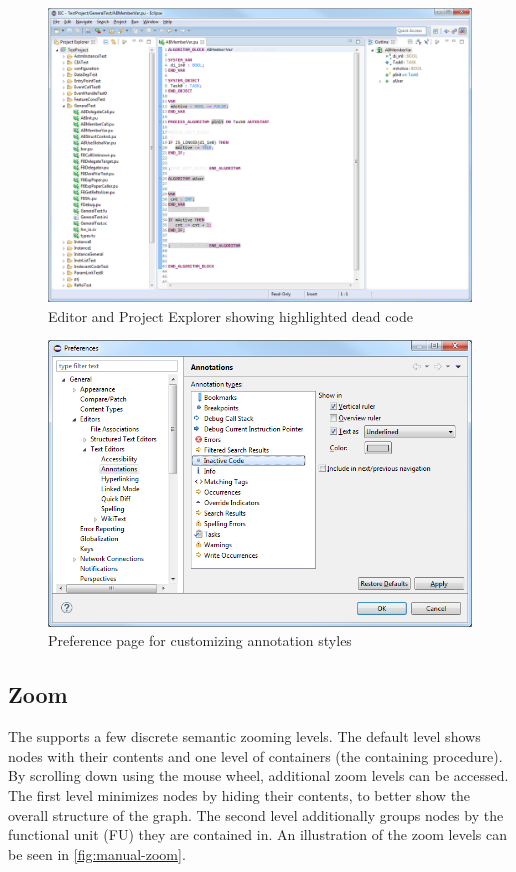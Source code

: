 \begin{figure}[htp]
  \centering
    \includegraphics[width=\textwidth]{bilder/manual-pruned}
  \caption{Editor and Project Explorer showing highlighted dead code}
  \label{fig:manual-pruned}
\end{figure}

\begin{figure}[htp]
  \centering
    \includegraphics[width=\textwidth]{bilder/manual-prefs_annotations}
  \caption{Preference page for customizing annotation styles}
  \label{fig:manual-prefs_annotations}
\end{figure}

\subsection{Zoom}

The \SB supports a few discrete semantic zooming levels. The default level shows nodes with their contents and one 
level of containers (the containing procedure). By scrolling down using the mouse wheel, additional zoom levels can be 
accessed. The first level minimizes nodes by hiding their contents, to better show the overall structure of the graph. 
The second level additionally groups nodes by the functional unit (FU) they are contained in. An illustration of the 
zoom levels can be seen in \autoref{fig:manual-zoom}.

